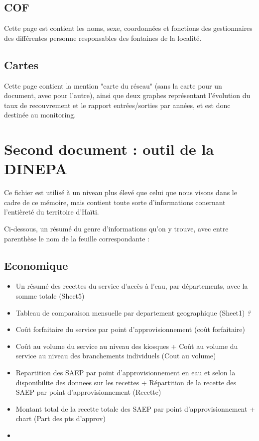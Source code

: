 \documentclass[a4paper, 11pt]{article}
\begin{document}
\subsection{COF}
Cette page est contient les noms, sexe, coordonnées et fonctions des gestionnaires des différentes personne responsables des fontaines de la localité.

\subsection{Cartes}
Cette page contient la mention "carte du réseau" (sans la carte pour un document, avec pour l'autre), ainsi que deux graphes représentant l'évolution du taux de recouvrement et le rapport entrées/sorties par années, et est donc destinée au monitoring.

\section{Second document : outil de la DINEPA}

Ce fichier est utilisé à un niveau plus élevé que celui que nous visons dans le cadre de ce mémoire, mais contient toute sorte d'informations conernant l'entièreté du territoire d'Haïti.

Ci-dessous, un résumé du genre d'informations qu'on y trouve, avec entre parenthèse le nom de la feuille correspondante :

\subsection{Economique}
\begin{itemize}
    \item Un résumé des recettes du service d'accès à l'eau, par départements, avec la somme totale (Sheet5)
    \item Tableau de comparaison mensuelle par departement geographique (Sheet1) \emph{?}
    \item Coût forfaitaire du service par point d'approvisionnement (coût forfaitaire)
    \item Coût au volume du service au niveau des kiosques + Coût au volume du service au niveau  des branchements individuels (Cout au volume)
    \item Repartition des SAEP par point d'approvisionnement en eau et selon la disponibilite des donnees sur les recettes + Répartition de la recette des SAEP par point d'approvisionnement (Recette)
    \item Montant total de la recette totale des SAEP par point d'approvisionnement + chart (Part des pts d'approv)
    \item
\end{itemize}
\end{document}
